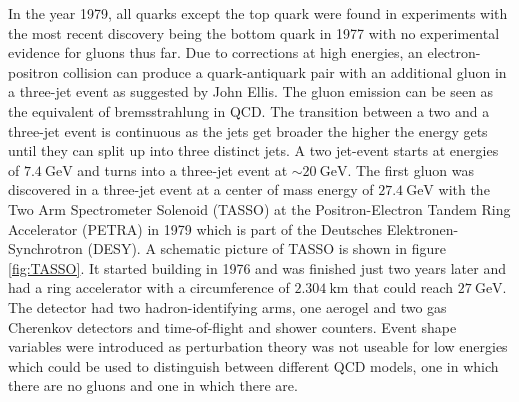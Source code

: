In the year 1979, all quarks except the top quark were found in experiments with the most recent discovery being the bottom quark in 1977 with no experimental evidence for gluons thus far.
Due to corrections at high energies, an electron-positron collision can produce a quark-antiquark pair with an additional gluon in a three-jet event as suggested by John Ellis.
The gluon emission can be seen as the equivalent of bremsstrahlung in QCD. %
The transition between a two and a three-jet event is continuous as the jets get broader the higher the energy gets until they can split up into three distinct jets.
A two jet-event starts at energies of $\SI{7.4}{\giga\eV}$ and turns into a three-jet event at $\sim\SI{20}{\giga\eV}$.
The first gluon was discovered in a three-jet event at a center of mass energy of $\SI{27.4}{\giga\eV}$ with the Two Arm Spectrometer Solenoid (TASSO) at the Positron-Electron Tandem Ring Accelerator (PETRA) in 1979 which is part of the Deutsches Elektronen-Synchrotron (DESY).
A schematic picture of TASSO is shown in figure \ref{fig:TASSO}.
It started building in 1976 and was finished just two years later and had a ring accelerator with a circumference of $\SI{2.304}{\kilo\meter}$ that could reach $\SI{27}{\giga\eV}$.
The detector had two hadron-identifying arms, one aerogel and two gas Cherenkov detectors and time-of-flight and shower counters.
Event shape variables were introduced as perturbation theory was not useable for low energies which could be used to distinguish between different QCD models, one in which there are no gluons and one in which there are.
